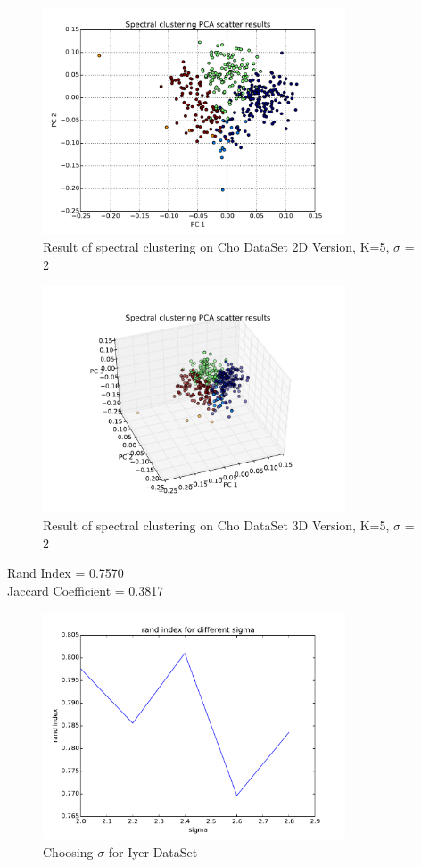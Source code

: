 \documentclass[paper=letter, fontsize=11pt]{article}
\numberwithin{equation}{section}		%
\numberwithin{figure}{section}			%
\numberwithin{table}{section}				%
\begin{document}
\begin{figure}[H]
	\centering
	\includegraphics[width=0.8\textwidth]{S_cho_2D.pdf}
	\caption{Result of spectral clustering on Cho DataSet  2D Version, K=5, $\sigma$ = 2}
\end{figure}

\begin{figure}[H]
	\centering
	\includegraphics[width=0.8\textwidth]{S_cho_3D.pdf}
	\caption{Result of spectral clustering on Cho DataSet 3D Version, K=5, $\sigma$ = 2}
\end{figure}
\noindent Rand Index = 0.7570\\
Jaccard Coefficient = 0.3817\\


\begin{figure}[H]
	\centering
	\includegraphics[width=0.8\textwidth]{choose_sigma_iyer.pdf}
	\caption{Choosing $\sigma$ for Iyer DataSet  }
\end{figure}
\end{document}
